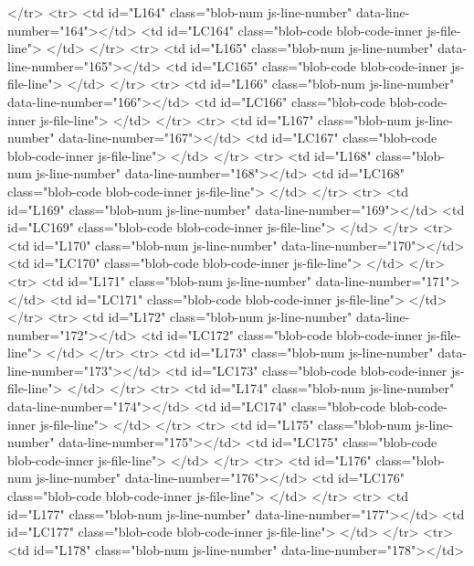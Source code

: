       </tr>
      <tr>
        <td id="L164" class="blob-num js-line-number" data-line-number="164"></td>
        <td id="LC164" class="blob-code blob-code-inner js-file-line">
</td>
      </tr>
      <tr>
        <td id="L165" class="blob-num js-line-number" data-line-number="165"></td>
        <td id="LC165" class="blob-code blob-code-inner js-file-line">
</td>
      </tr>
      <tr>
        <td id="L166" class="blob-num js-line-number" data-line-number="166"></td>
        <td id="LC166" class="blob-code blob-code-inner js-file-line">
</td>
      </tr>
      <tr>
        <td id="L167" class="blob-num js-line-number" data-line-number="167"></td>
        <td id="LC167" class="blob-code blob-code-inner js-file-line">
</td>
      </tr>
      <tr>
        <td id="L168" class="blob-num js-line-number" data-line-number="168"></td>
        <td id="LC168" class="blob-code blob-code-inner js-file-line">
</td>
      </tr>
      <tr>
        <td id="L169" class="blob-num js-line-number" data-line-number="169"></td>
        <td id="LC169" class="blob-code blob-code-inner js-file-line">
</td>
      </tr>
      <tr>
        <td id="L170" class="blob-num js-line-number" data-line-number="170"></td>
        <td id="LC170" class="blob-code blob-code-inner js-file-line">
</td>
      </tr>
      <tr>
        <td id="L171" class="blob-num js-line-number" data-line-number="171"></td>
        <td id="LC171" class="blob-code blob-code-inner js-file-line">
</td>
      </tr>
      <tr>
        <td id="L172" class="blob-num js-line-number" data-line-number="172"></td>
        <td id="LC172" class="blob-code blob-code-inner js-file-line">
</td>
      </tr>
      <tr>
        <td id="L173" class="blob-num js-line-number" data-line-number="173"></td>
        <td id="LC173" class="blob-code blob-code-inner js-file-line">
</td>
      </tr>
      <tr>
        <td id="L174" class="blob-num js-line-number" data-line-number="174"></td>
        <td id="LC174" class="blob-code blob-code-inner js-file-line">
</td>
      </tr>
      <tr>
        <td id="L175" class="blob-num js-line-number" data-line-number="175"></td>
        <td id="LC175" class="blob-code blob-code-inner js-file-line">
</td>
      </tr>
      <tr>
        <td id="L176" class="blob-num js-line-number" data-line-number="176"></td>
        <td id="LC176" class="blob-code blob-code-inner js-file-line">
</td>
      </tr>
      <tr>
        <td id="L177" class="blob-num js-line-number" data-line-number="177"></td>
        <td id="LC177" class="blob-code blob-code-inner js-file-line">
</td>
      </tr>
      <tr>
        <td id="L178" class="blob-num js-line-number" data-line-number="178"></td>
